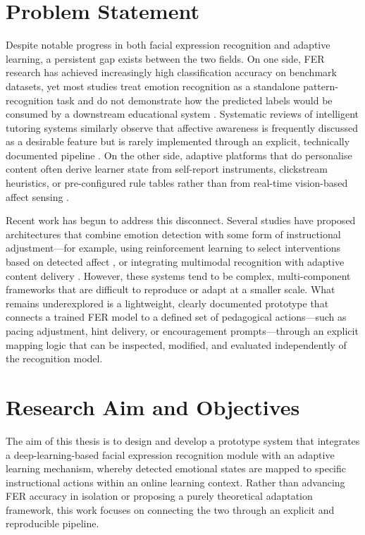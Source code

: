 \section{Problem Statement}

Despite notable progress in both facial expression recognition and adaptive learning, a persistent gap exists between the two fields. On one side, FER research has achieved increasingly high classification accuracy on benchmark datasets, yet most studies treat emotion recognition as a standalone pattern-recognition task and do not demonstrate how the predicted labels would be consumed by a downstream educational system \cite{lek_academic_2023, fernandez-herrero_evaluating_2024}. Systematic reviews of intelligent tutoring systems similarly observe that affective awareness is frequently discussed as a desirable feature but is rarely implemented through an explicit, technically documented pipeline \cite{zerkouk_comprehensive_2025}. On the other side, adaptive platforms that do personalise content often derive learner state from self-report instruments, clickstream heuristics, or pre-configured rule tables rather than from real-time vision-based affect sensing \cite{sayed_ai-based_2023}.

Recent work has begun to address this disconnect. Several studies have proposed architectures that combine emotion detection with some form of instructional adjustment---for example, using reinforcement learning to select interventions based on detected affect \cite{govea_implementation_2024, meng_self-evolving_2025}, or integrating multimodal recognition with adaptive content delivery \cite{gong_design_2025, kong_real-time_2025}. However, these systems tend to be complex, multi-component frameworks that are difficult to reproduce or adapt at a smaller scale. What remains underexplored is a lightweight, clearly documented prototype that connects a trained FER model to a defined set of pedagogical actions---such as pacing adjustment, hint delivery, or encouragement prompts---through an explicit mapping logic that can be inspected, modified, and evaluated independently of the recognition model.


\section{Research Aim and Objectives}

The aim of this thesis is to design and develop a prototype system that integrates a deep-learning-based facial expression recognition module with an adaptive learning mechanism, whereby detected emotional states are mapped to specific instructional actions within an online learning context. Rather than advancing FER accuracy in isolation or proposing a purely theoretical adaptation framework, this work focuses on connecting the two through an explicit and reproducible pipeline.

